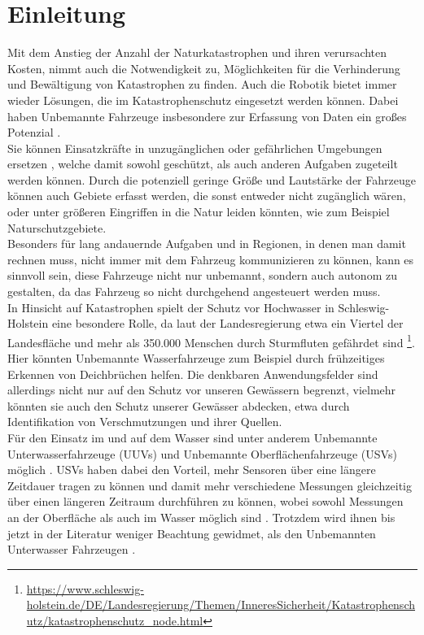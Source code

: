 \documentclass[conference]{IEEEtran}
\begin{document}
\section{Einleitung}
Mit dem Anstieg der Anzahl der Naturkatastrophen und ihren verursachten Kosten\cite{b1}, nimmt auch die Notwendigkeit zu,  Möglichkeiten für die Verhinderung und Bewältigung von Katastrophen zu finden. Auch die Robotik bietet immer wieder Lösungen, die im Katastrophenschutz eingesetzt werden können. Dabei haben Unbemannte Fahrzeuge insbesondere zur Erfassung von Daten ein großes Potenzial \cite{b2}.\\
Sie können Einsatzkräfte in unzugänglichen oder gefährlichen Umgebungen ersetzen \cite{b3}, welche damit sowohl geschützt, als auch anderen Aufgaben zugeteilt werden können.  Durch die potenziell geringe Größe und Lautstärke der Fahrzeuge können auch Gebiete erfasst werden, die sonst entweder nicht zugänglich wären, oder unter größeren Eingriffen in die Natur leiden könnten, wie zum Beispiel Naturschutzgebiete.\\
Besonders für lang andauernde Aufgaben und in Regionen, in denen man damit rechnen muss, nicht immer mit dem Fahrzeug kommunizieren zu können, kann es sinnvoll sein, diese Fahrzeuge nicht nur unbemannt, sondern auch autonom zu gestalten, da das Fahrzeug so nicht durchgehend angesteuert werden muss.\\
In Hinsicht auf Katastrophen spielt der Schutz vor Hochwasser in Schleswig-Holstein eine besondere Rolle, da laut der Landesregierung etwa ein Viertel der Landesfläche und mehr als 350.000 Menschen durch Sturmfluten gefährdet sind \footnote{\url{https://www.schleswig-holstein.de/DE/Landesregierung/Themen/InneresSicherheit/Katastrophenschutz/katastrophenschutz_node.html}}. Hier könnten Unbemannte Wasserfahrzeuge zum Beispiel durch frühzeitiges Erkennen von Deichbrüchen helfen. Die denkbaren Anwendungsfelder sind allerdings nicht nur auf den Schutz vor unseren Gewässern begrenzt, vielmehr könnten sie auch den Schutz unserer Gewässer abdecken, etwa durch Identifikation von Verschmutzungen und ihrer Quellen.\\
Für den Einsatz im und auf dem Wasser sind unter anderem Unbemannte Unterwasserfahrzeuge (UUVs) und Unbemannte Oberflächenfahrzeuge (USVs) möglich \cite{b2}. USVs haben dabei den Vorteil, mehr Sensoren über eine längere Zeitdauer tragen zu können und damit mehr verschiedene Messungen gleichzeitig über einen längeren Zeitraum durchführen zu können, wobei sowohl Messungen an der Oberfläche als auch im Wasser möglich sind \cite{b5}. Trotzdem wird ihnen bis jetzt in der Literatur weniger Beachtung gewidmet, als den Unbemannten Unterwasser Fahrzeugen \cite{b2}.\\
\end{document}
